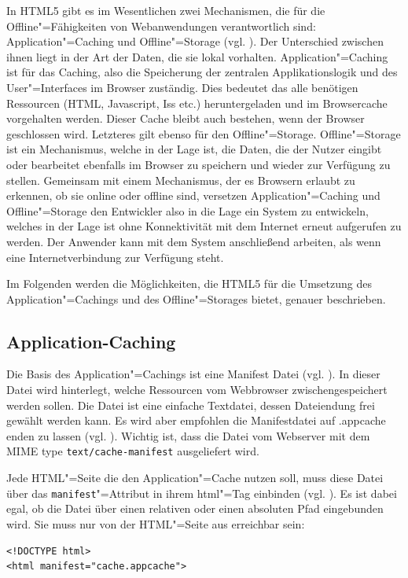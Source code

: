 In HTML5 gibt es im Wesentlichen zwei Mechanismen, die für die Offline"=Fähigkeiten von Webanwendungen verantwortlich sind: Application"=Caching und Offline"=Storage (vgl. \cite{Mahemoff22010}). Der Unterschied zwischen ihnen liegt in der Art der Daten, die sie lokal vorhalten. Application"=Caching ist für das Caching, also die Speicherung der zentralen Applikationslogik und des User"=Interfaces im Browser zuständig. Dies bedeutet das alle benötigen Ressourcen (HTML, Javascript, Iss etc.) heruntergeladen und im Browsercache vorgehalten werden. Dieser Cache bleibt auch bestehen, wenn der Browser geschlossen wird. Letzteres gilt ebenso für den Offline"=Storage. Offline"=Storage ist ein Mechanismus, welche in der Lage ist, die Daten, die der Nutzer eingibt oder bearbeitet ebenfalls im Browser zu speichern und wieder zur Verfügung zu stellen. Gemeinsam mit einem Mechanismus, der es Browsern erlaubt zu erkennen, ob sie online oder offline sind, versetzen Application"=Caching und Offline"=Storage den Entwickler also in die Lage ein System zu entwickeln, welches in der Lage ist ohne Konnektivität mit dem Internet erneut aufgerufen zu werden. Der Anwender kann mit dem System anschließend arbeiten, als wenn eine Internetverbindung zur Verfügung steht.

Im Folgenden werden die Möglichkeiten, die HTML5 für die Umsetzung des Application"=Cachings und des Offline"=Storages bietet, genauer beschrieben.

\subsection{Application-Caching}\label{section:appcache}
Die Basis des Application"=Cachings ist eine Manifest Datei (vgl. \cite{Bidelman2010}). In dieser Datei wird hinterlegt, welche Ressourcen vom Webbrowser zwischengespeichert werden sollen. Die Datei ist eine einfache Textdatei, dessen Dateiendung frei gewählt werden kann. Es wird aber empfohlen die Manifestdatei auf .appcache enden zu lassen (vgl. \cite{W3C2012}). Wichtig ist, dass die Datei vom Webserver mit dem MIME type \texttt{text/cache-manifest} ausgeliefert wird.

Jede HTML"=Seite die den Application"=Cache nutzen soll, muss diese Datei über das \texttt{ma\allowbreak ni\allowbreak fest}"=Attribut in ihrem html"=Tag einbinden (vgl. \cite{html5upandrunningchapter8}). Es ist dabei egal, ob die Datei über einen relativen oder einen absoluten Pfad eingebunden wird. Sie muss nur von der HTML"=Seite aus erreichbar sein:
\begin{lstlisting}
<!DOCTYPE html>
<html manifest="cache.appcache">
\end{lstlisting}

